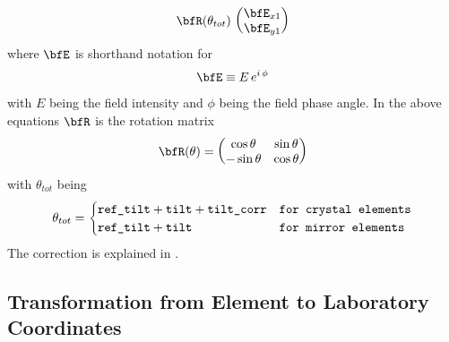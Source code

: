 \begin{enumerate}
\begin{align}
    \bfR (\theta_{tot}) \,   \begin{pmatrix} \bfE_{x1} \\ \bfE_{y1} \end{pmatrix} \nonumber
\end{align}
where $\bfE$ is shorthand notation for
\begin{equation}
  \bfE \equiv E \, e^{i \, \phi}
\end{equation}
with $E$ being the field intensity and $\phi$ being the field phase angle.
In the above equations $\bfR$ is the rotation matrix
\begin{equation}
  \bfR(\theta) = \begin{pmatrix} \cos\theta & \sin\theta \\ -\sin\theta & \cos\theta \end{pmatrix}
\end{equation}
with $\theta_{tot}$ being 
\begin{equation}
  \theta_{tot}  = 
  \begin{cases}
    \vn{ref_tilt} + \vn{tilt} + \vn{tilt_corr} & \vn{for crystal elements} \\
    \vn{ref_tilt} + \vn{tilt} & \vn{for mirror elements}
  \end{cases}
  \label{tttt}
\end{equation}
The  correction is explained in .
\end{enumerate}

\subsection{Transformation from Element to Laboratory Coordinates}
\label{s:crystal.trans.el}

